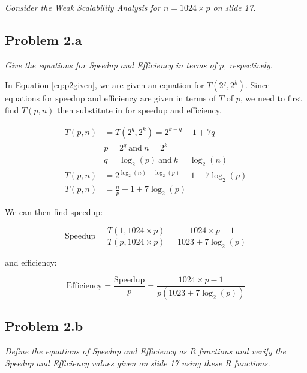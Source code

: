 \documentclass[12pt,letterpaper]{article}
\newcommand{\problem}[1]{\textit{#1} \medskip}
\begin{document}
\problem{Consider the Weak Scalability Analysis for $n = 1024\times p$ on slide 17.}

\subsection*{Problem 2.a}

\problem{Give the equations for Speedup and Efficiency in terms of $p$, respectively.}

In Equation \ref{eq:p2given}, we are given an equation for $T(2^q, 2^k)$. Since equations for speedup
and efficiency are given in terms of $T$ of $p$, we need to first find $T(p, n)$ then substitute in
for speedup and efficiency.

\begin{align} 
    T(p, n) &= T(2^q, 2^k) = 2^{k-q}-1+7q \label{eq:p2given}\\
    &p = 2^q\ \text{and}\ n = 2^k \nonumber\\
    &q = \log_2(p)\ \text{and}\ k = \log_2(n) \label{eq:qk}\\
    T(p, n) &= 2^{\log_2(n)-\log_2(p)}-1+7 \log_2(p) \nonumber\\
    T(p, n) &= \frac{n}{p}-1+7 \log_2(p) \label{eq:fort}
\end{align}

We can then find speedup:

\begin{equation} \label{eq:p2speedup}
    \text{Speedup} = \frac{T(1, 1024\times p)}{T(p, 1024\times p)} = \frac{1024\times p-1}{1023+7\log_2(p)}
\end{equation}

and efficiency:

\begin{equation} \label{eq:p2efficiency}
    \text{Efficiency} = \frac{\text{Speedup}}{p} = \frac{1024\times p-1}{p(1023+7\log_2(p))}
\end{equation}

\subsection*{Problem 2.b}

\problem{Define the equations of Speedup and Efficiency as R functions and verify the
Speedup and Efficiency values given on slide 17 using these R functions.}


\end{document}
